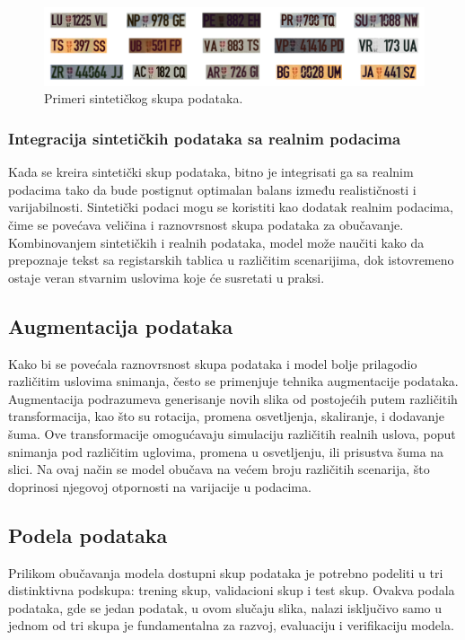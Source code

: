 \documentclass[a4paper,12pt]{article}
\begin{document}
	\begin{figure}[H]
		\centering
		\includegraphics[width=\textwidth]{assets/synthetic-license-plates.png}
		\caption{Primeri sintetičkog skupa podataka.}
		\label{fig:synthetic-license-plates}
	\end{figure}
	
	\subsubsection{Integracija sintetičkih podataka sa realnim podacima}
	Kada se kreira sintetički skup podataka, bitno je integrisati ga sa realnim podacima tako da bude postignut optimalan balans između realističnosti i varijabilnosti. Sintetički podaci mogu se koristiti kao dodatak realnim podacima, čime se povećava veličina i raznovrsnost skupa podataka za obučavanje. Kombinovanjem sintetičkih i realnih podataka, model može naučiti kako da prepoznaje tekst sa registarskih tablica u različitim scenarijima, dok istovremeno ostaje veran stvarnim uslovima koje će susretati u praksi.
	
	\subsection{Augmentacija podataka}
	Kako bi se povećala raznovrsnost skupa podataka i model bolje prilagodio različitim uslovima snimanja, često se primenjuje tehnika augmentacije podataka. Augmentacija podrazumeva generisanje novih slika od postojećih putem različitih transformacija, kao što su rotacija, promena osvetljenja, skaliranje, i dodavanje šuma. Ove transformacije omogućavaju simulaciju različitih realnih uslova, poput snimanja pod različitim uglovima, promena u osvetljenju, ili prisustva šuma na slici. Na ovaj način se model obučava na većem broju različitih scenarija, što doprinosi njegovoj otpornosti na varijacije u podacima.
	
	\subsection{Podela podataka}
	Prilikom obučavanja modela dostupni skup podataka je potrebno podeliti u tri distinktivna podskupa: trening skup, validacioni skup i test skup. Ovakva podala podataka, gde se jedan podatak, u ovom slučaju slika, nalazi isključivo samo u jednom od tri skupa je fundamentalna za razvoj, evaluaciju i verifikaciju modela.
	
\end{document}
